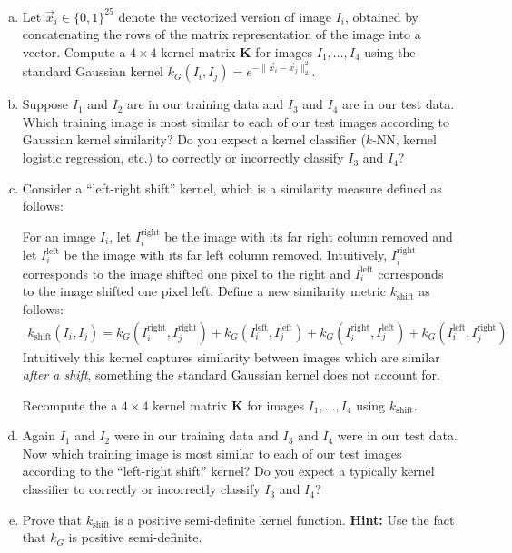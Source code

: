 \documentclass[10pt]{article}
\newcommand{\bv}[1]{\mathbf{#1}}
\begin{document}
\begin{enumerate}[(a)]
	\item Let $\vec{x}_i \in \{0,1\}^{25}$ denote the vectorized version of image $I_i$, obtained by concatenating the rows of the matrix representation of the image into a vector. Compute a $4\times 4$ kernel matrix $\bv{K}$ for images $I_1, \ldots, I_4$ using the standard Gaussian kernel $k_G(I_i, I_j) = e^{-\|\vec{x}_i - \vec{x}_j\|_2^2}$. 

	\item Suppose $I_1$ and $I_2$ are in our training data and $I_3$ and $I_4$ are in our test data. Which training image is most similar to each of our test images according to Gaussian kernel similarity? Do you expect a kernel classifier ($k$-NN, kernel logistic regression, etc.) to correctly or incorrectly classify $I_3$ and $I_4$?
	
	
	\item Consider a ``left-right shift'' kernel, which is a similarity measure defined as follows:
	
	For an image $I_i$, let $I_i^{\text{right}}$ be the image with its far right column removed and let $I_i^{\text{left}}$ be the image with its far left column removed. Intuitively, $I_i^{\text{right}}$ corresponds to the image shifted one pixel to the right and $I_i^{\text{left}}$ corresponds to the image shifted one pixel left. Define a new similarity metric $k_{\text{shift}}$ as follows: 
	\begin{align*}
	k_{\text{shift}}(I_i, I_j) = k_G(I_i^\text{right}, I_j^\text{right}) + k_G(I_i^\text{left}, I_j^\text{left}) + k_G(I_i^{\text{right}}, I_j^{\text{left}}) + k_G(I_i^{\text{left}}, I_j^{\text{right}}) 
	\end{align*}
	Intuitively this kernel captures similarity between images which are similar \emph{after a shift}, something the standard Gaussian kernel does not account for. 
	
	Recompute the a $4\times 4$ kernel matrix $\bv{K}$ for images $I_1, \ldots, I_4$ using $k_{\text{shift}}$. 
	
	\item Again $I_1$ and $I_2$ were in our training data and $I_3$ and $I_4$ were in our test data. Now which training image is most similar to each of our test images according to the ``left-right shift'' kernel? Do you expect a typically kernel classifier to correctly or incorrectly classify $I_3$ and $I_4$?
	
	\item Prove that $k_{\text{shift}}$ is a positive semi-definite kernel function. \textbf{Hint:} Use the fact that $k_G$ is positive semi-definite.
\end{enumerate}
\end{document}
